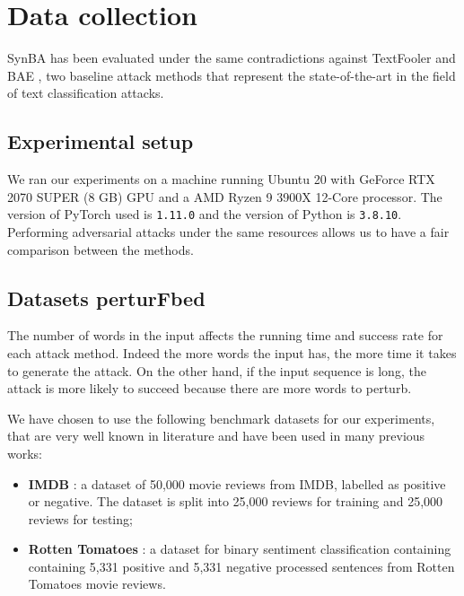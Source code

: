 \section{Data collection}\label{sec:data-collection}

SynBA has been evaluated under the same contradictions against TextFooler \cite{conf/emnlp/LiMGXQ20} and BAE \cite{conf/emnlp/GargR20}, two baseline attack methods that represent  the state-of-the-art in the field of text classification attacks. 
\subsection{Experimental setup}\label{subsec:experimental-setup}

We ran our experiments on a machine running
Ubuntu 20 with GeForce RTX 2070 SUPER (8 GB) GPU and a AMD Ryzen 9 3900X 12-Core processor.
The version of PyTorch used is \texttt{1.11.0} and the version of Python is \texttt{3.8.10}.
Performing adversarial attacks under the same resources allows us to have a fair comparison between the methods.


\subsection{Datasets perturFbed}\label{subsec:datasets-perturbed}

The number of words in the input affects the running time and success rate for each attack method. 
Indeed the more words the input has, the more time it takes to generate the attack.
On the other hand, if the input sequence is long, the attack is more likely to succeed because there are more words to perturb.

We have chosen to use the following benchmark datasets for our experiments, that are very well known in literature and have been used in many previous works:
\begin{itemize}
    \item \textbf{IMDB} \cite{maas-EtAl:2011:ACL-HLT2011}: a dataset of 50,000 movie reviews from IMDB, labelled as positive or negative. The dataset is split into 25,000 reviews for training and 25,000 reviews for testing;
    \item \textbf{Rotten Tomatoes} \cite{pang-lee:2005a}: a dataset for binary sentiment classification  containing containing 5,331 positive and 5,331 negative processed sentences from Rotten Tomatoes movie reviews.
\end{itemize}

